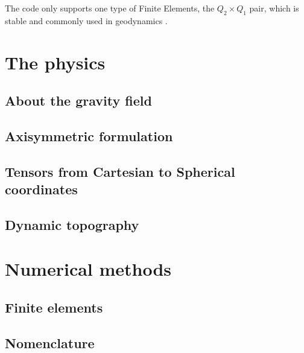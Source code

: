 \documentclass[a4paper,12pt]{article}
\begin{document}
The code only supports one type of Finite Elements, the $Q_2\times Q_1$ pair, 
which is stable and commonly used in geodynamics \cite{thba22}.

\newpage
\section{The physics}


\subsection{About the gravity field}


\subsection{Axisymmetric formulation}


\subsection{Tensors from Cartesian to Spherical coordinates}


\subsection{Dynamic topography}



\newpage
\section{Numerical methods}

\subsection{Finite elements}


\subsection{Nomenclature}

\end{document}

